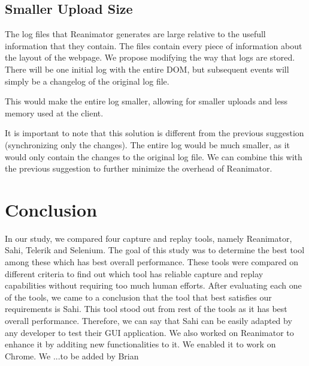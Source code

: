 \documentclass[12pt,journal]{IEEEtran}
\begin{document}
\subsection{Smaller Upload Size}
The log files that Reanimator generates are large relative to the usefull information that they contain. The files contain every piece of information about the layout of the webpage. We propose modifying the way that logs are stored. There will be one initial log with the entire DOM, but subsequent events will simply be a changelog of the original log file.
\par
This would make the entire log smaller, allowing for smaller uploads and less memory used at the client.
\par
It is important to note that this solution is different from the previous suggestion (synchronizing only the changes). The entire log would be much smaller, as it would only contain the changes to the original log file. We can combine this with the previous suggestion to further minimize the overhead of Reanimator.

\section{Conclusion}
In our study, we compared four capture and replay tools, namely Reanimator, Sahi, Telerik and Selenium. The goal of this study was to determine the best tool among these which has best overall performance. These tools were compared on different criteria to find out which tool has reliable capture and replay capabilities without requiring too much human efforts. After evaluating each one of the tools, we came to a conclusion that the tool that best satisfies our requirements is Sahi. This tool stood out from rest of the tools as it has best overall performance. Therefore, we can say that Sahi can be easily adapted by any developer to test their GUI application. We also worked on Reanimator to enhance it by additing new functionalities to it. We enabled it to work on Chrome. We ...{to be added by Brian}




\printbibliography
\end{document}
